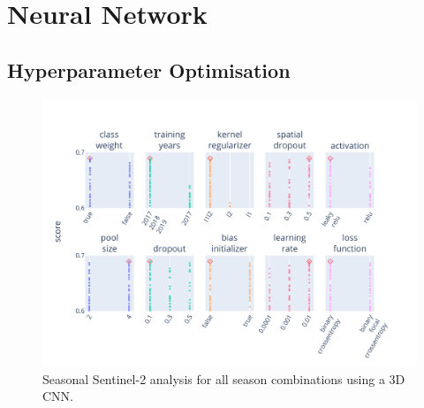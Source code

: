 \chapter{Neural Network}
\label{chapter:hyper}
\section{Hyperparameter Optimisation}

\begin{figure}[ht]
    \centering
    \includegraphics[width=0.9\linewidth, trim={10pt 10pt 40pt 40pt}, clip]{figures/figures_tuner/fixed_layers.pdf}
    \caption{Seasonal Sentinel-2 analysis for all season combinations using a 3D CNN.}
    \label{fig:fixed_layers}
\end{figure}
